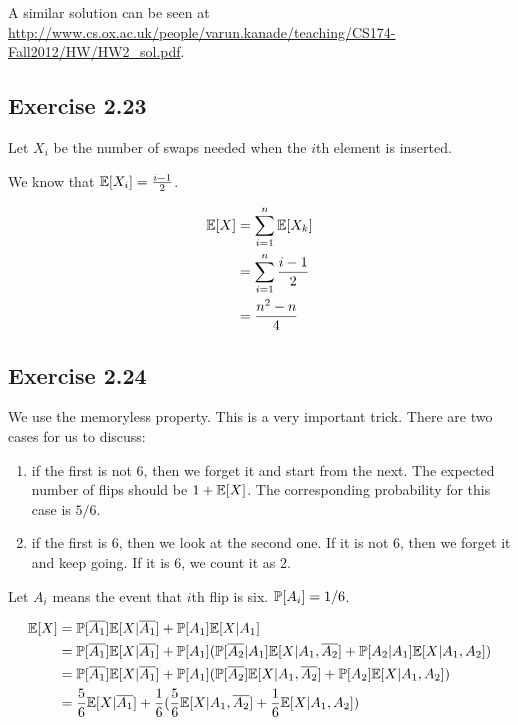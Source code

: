 A similar solution can be seen at \url{http://www.cs.ox.ac.uk/people/varun.kanade/teaching/CS174-Fall2012/HW/HW2_sol.pdf}.

\subsection*{Exercise 2.23}

Let $X_i$ be the number of swaps needed when the $i$th element is inserted.

We know that $\E[X_i] = \frac{i - 1}{2}$.

\begin{equation*}
\begin{split}
\E[X] & = \sum_{i=1}^{n} \E[X_k] \\
& = \sum_{i=1}^{n} \frac{i - 1}{2} \\
& = \frac{n^2-n}{4}
\end{split}
\end{equation*}

\subsection*{Exercise 2.24}

We use the memoryless property. This is a very important trick. 
There are two cases for us to discuss: 
\begin{enumerate}
	\item if the first is not 6, then we forget it
	and start from the next. The expected number of flips should be $1 + \E[X]$.
	The corresponding probability for this case is $5/6$.
	\item if the first is 6, then we look at the second one. If it is not 6, then we forget it
	and keep going. If it is 6, we count it as 2.
\end{enumerate}

Let $A_i$ means the event that $i$th flip is six. $\P[A_i] = 1/6$.

\begin{equation*}
\begin{split}
\E[X] & = \P[\overline{A_1}]\E[X | \overline{A_1}]
+ \P[A_1]\E[X|A_1] \\
& = \P[\overline{A_1}]\E[X | \overline{A_1}] + 
\P[A_1](\P[\overline{A_2} | A_1] \E[X|A_1,\overline{A_2}] +  
\P[A_2 | A_1] \E[X|A_1,A_2]) \\
& = \P[\overline{A_1}]\E[X | \overline{A_1}] + 
\P[A_1](\P[\overline{A_2}] \E[X|A_1,\overline{A_2}] +  
\P[A_2] \E[X|A_1,A_2]) \\
& = \frac{5}{6}\E[X | \overline{A_1}] + 
\frac{1}{6}(\frac{5}{6} \E[X|A_1,\overline{A_2}] +  
\frac{1}{6} \E[X|A_1,A_2]) \\
\end{split}
\end{equation*}

